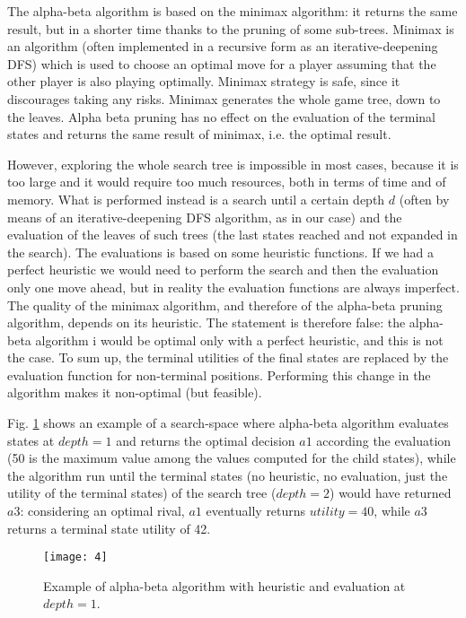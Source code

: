The alpha-beta algorithm is based on the minimax algorithm: it returns the same result, but in a shorter time thanks to the pruning of some sub-trees. Minimax is an algorithm (often implemented in a recursive form as an iterative-deepening DFS) which is used to choose an optimal move for a player assuming that the other player is also playing optimally. Minimax strategy is safe, since it discourages taking any risks. Minimax generates the whole game tree, down to the leaves. Alpha beta pruning has no effect on the evaluation of the terminal states and returns the same result of minimax, i.e. the optimal result.

However, exploring the whole search tree is impossible in most cases, because it is too large and it would require too much resources, both in terms of time and of memory. What is performed instead is a search until a certain depth $d$ (often by means of an iterative-deepening DFS algorithm, as in our case) and the evaluation of the leaves of such trees (the last states reached and not expanded in the search). The evaluations is based on some heuristic functions. If we had a perfect heuristic we would need to perform the search and then the evaluation only one move ahead, but in reality the evaluation functions are always imperfect. The quality of the minimax algorithm, and therefore of the alpha-beta pruning algorithm, depends on its heuristic.  The statement is therefore false: the alpha-beta algorithm i would be optimal only with  a perfect heuristic, and this is not the case. To sum up, the terminal utilities of the final states are replaced by the evaluation function for non-terminal positions. Performing this change in the algorithm makes it non-optimal (but feasible).

Fig. \ref{fig:4} shows an example of a search-space where alpha-beta algorithm evaluates states at $depth=1$ and returns the optimal decision $a1$ according the evaluation (50 is the maximum value among the values computed for the child states), while the algorithm run until the terminal states (no heuristic, no evaluation, just the utility of the terminal states) of the search tree ($depth = 2$) would have returned $a3$: considering an optimal rival, $a1$ eventually returns $utility = 40$, while $a3$ returns a terminal state utility of 42.

\begin{figure}[h]
    \centering
    \texttt{[image: 4]}
    \caption{Example of alpha-beta algorithm with heuristic and evaluation at $depth = 1$.}
    \label{fig:4}
\end{figure}